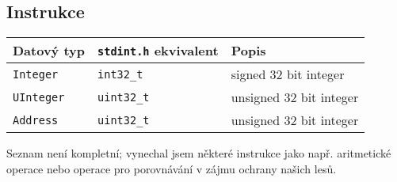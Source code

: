 \documentclass[10pt,a4paper]{article}
\begin{document}
\subsection{Instrukce}

\begin{center}
\begin{tabular}{ l l l }
Datový typ & \verb"stdint.h" ekvivalent & Popis \\
\hline
\texttt{Integer}  & \verb"int32_t" & signed 32 bit integer \\
\texttt{UInteger} & \verb"uint32_t" & unsigned 32 bit integer \\
\texttt{Address}  & \verb"uint32_t" & unsigned 32 bit integer \\
\end{tabular}
\end{center}

Seznam není kompletní; vynechal jsem některé instrukce jako např. aritmetické
operace nebo operace pro porovnávání v zájmu ochrany našich lesů.
\end{document}

